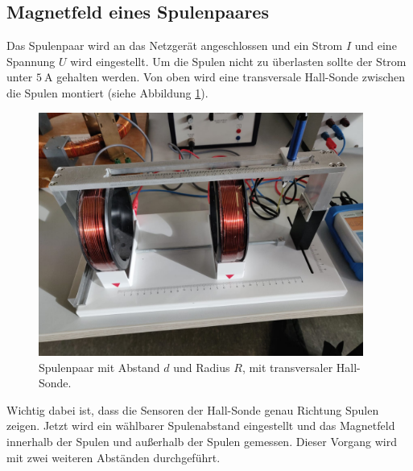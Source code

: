 \subsection{Magnetfeld eines Spulenpaares}
Das Spulenpaar wird an das Netzgerät angeschlossen und ein Strom $I$ und eine Spannung $U$ wird eingestellt.
Um die Spulen nicht zu überlasten sollte der Strom unter $\SI{5}{\ampere}$ gehalten werden.
Von oben wird eine transversale Hall-Sonde zwischen die Spulen montiert (siehe Abbildung \ref{fig:spulenpaar}).
\begin{figure}
    \centering
    \includegraphics[height=8cm]{content/spulenpaar.jpg}
    \caption{Spulenpaar mit Abstand $d$ und Radius $R$, mit transversaler Hall-Sonde.}
    \label{fig:spulenpaar}
\end{figure}
\FloatBarrier
Wichtig dabei ist, dass die Sensoren der Hall-Sonde genau Richtung Spulen zeigen.
Jetzt wird ein wählbarer Spulenabstand eingestellt und das Magnetfeld innerhalb der Spulen und außerhalb der Spulen gemessen.
Dieser Vorgang wird mit zwei weiteren Abständen durchgeführt.

